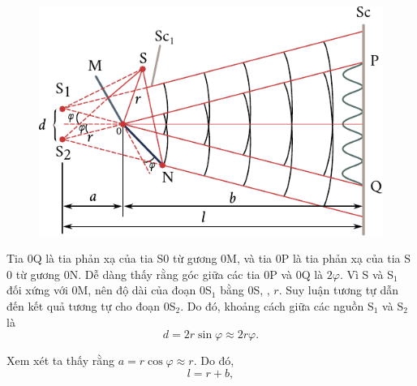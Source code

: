 \begin{figure}[!htb]
	\begin{center}
		\includegraphics[scale=0.98]{figures/ch_17/fig_17_8.pdf}
		\caption[]{}
		\label{fig:17_8}
	\end{center}
	\vspace{-0.9cm}
\end{figure}

Tia $0$Q là tia phản xạ của tia S$0$ từ gương $0$M, và tia $0$P là tia phản xạ của tia S$0$ từ gương $0$N.
Dễ dàng thấy rằng góc giữa các tia $0$P và $0$Q là $2\varphi$.
Vì S và S$_1$ đối xứng với $0$M, nên độ dài của đoạn $0$S$_1$ bằng $0$S, \ie, $r$.
Suy luận tương tự dẫn đến kết quả tương tự cho đoạn $0$S$_2$.
Do đó, khoảng cách giữa các nguồn S$_1$ và S$_2$ là
\begin{equation*}
    d = 2r \sin\varphi \approx 2 r \varphi.
\end{equation*}

\noindent
Xem xét  ta thấy rằng $a=r \cos\varphi \approx r$. Do đó,
\begin{equation*}
    l = r + b,
\end{equation*}

